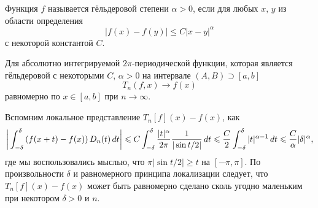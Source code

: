 
\begin{to_def}
    Функция $f$ называется гёльдеровой степени $\alpha > 0$, если для любых $x, \, y$ из области определения
    \begin{equation*}
        |f(x) -f(y)| \leq C |x-y|^{\alpha}
    \end{equation*}
    с некоторой константой $C$.
\end{to_def}


\begin{to_thr}
    Для абсолютно интегрируемой $2\pi$-периодической функции, которая является гёльдеровой с некоторыми $C$, $\alpha > 0$ на интервале $(A, B) \supset [a, b]$
    \begin{equation*}
        T_n (f, x) \to f(x)
    \end{equation*}
    равномерно по $x \in [a, b]$ при $n \to \infty$.
\end{to_thr}

\begin{uproof}
    Вспомним локальное представление $T_n[f](x) - f(x)$, как
    \begin{equation*}
        \bigg|
            \int_{-\delta}^{\delta} \left(f(x+t)-f(x)\right) D_n (t) \, d t
        \bigg|  \leqslant 
        C \int_{-\delta}^{\delta} \frac{|t|^\alpha}{2\pi}
        \frac{1}{|\sin t/2|} \, d t \leqslant 
        \frac{C}{2} \int_{-\delta}^{\delta} |t|^{\alpha-1} \, d t \leqslant \frac{C}{\alpha} |\delta|^\alpha,
    \end{equation*}
    где мы воспользовались мыслью, что $\pi |\sin t/2| \geq t$ на $[-\pi, \pi]$. По произвольности $\delta$ и равномерного принципа локализации следует, что $T_n[f](x) - f(x)$ может быть равномерно сделано сколь угодно маленьким при некотором $\delta > 0$ и $n$. 
\end{uproof}


